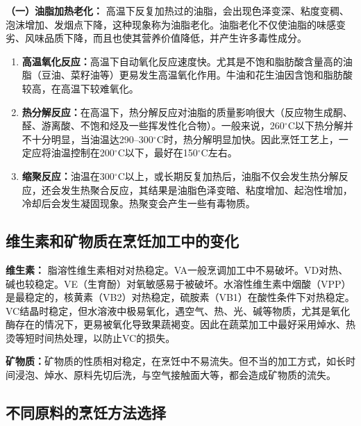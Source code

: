 \begin{tipbox}
\textbf{（一）油脂加热老化：}%
高温下反复加热过的油脂，会出现色泽变深、粘度变稠、泡沫增加、发烟点下降，这种现象称为油脂老化。油脂老化不仅使油脂的味感变劣、风味品质下降，而且也使其营养价值降低，并产生许多毒性成分。

\begin{enumerate}[leftmargin=*]
    \item \textbf{高温氧化反应：}高温下自动氧化反应速度快。尤其是不饱和脂肪酸含量高的油脂（豆油、菜籽油等）更易发生高温氧化作用。牛油和花生油因含饱和脂肪酸较高，在高温下较难氧化。
    \item \textbf{热分解反应：}在高温下，热分解反应对油脂的质量影响很大（反应物生成酮、醛、游离酸、不饱和烃及一些挥发性化合物）。一般来说，260$^\circ$C以下热分解并不十分明显，当油温达290--300$^\circ$C时，热分解明显加快。因此烹饪工艺上，一定应将油温控制在200$^\circ$C以下，最好在150$^\circ$C左右。
    \item \textbf{缩聚反应：}油温在300$^\circ$C以上，或长期反复加热后，油脂不仅会发生热分解反应，还会发生热聚合反应，其结果是油脂色泽变暗、粘度增加、起泡性增加，冷却后会发生凝固现象。热聚变会产生一些有毒物质。
\end{enumerate}
\end{tipbox}

\subsection{维生素和矿物质在烹饪加工中的变化}

\begin{tipbox}
\textbf{维生素：}%
脂溶性维生素相对对热稳定。VA一般烹调加工中不易破坏。VD对热、碱也较稳定。VE（生育酚）对氧敏感易于被破坏。水溶性维生素中烟酸（VPP）是最稳定的，核黄素（VB2）对热稳定，硫胺素（VB1）在酸性条件下对热稳定。VC结晶时稳定，但水溶液中极易氧化，遇空气、热、光、碱等物质，尤其是氧化酶存在的情况下，更易被氧化导致果蔬褐变。因此在蔬菜加工中最好采用焯水、热烫等短时间热处理，以防止VC的损失。

\textbf{矿物质：}矿物质的性质相对稳定，在烹饪中不易流失。但不当的加工方式，如长时间浸泡、焯水、原料先切后洗，与空气接触面大等，都会造成矿物质的流失。
\end{tipbox}

\subsection{不同原料的烹饪方法选择}

